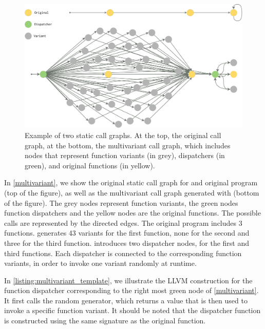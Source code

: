 \begin{figure}
    \centering
  \includegraphics[width=.9\linewidth]{diagrams/CFG.pdf}
  \caption{Example of two static call graphs. At the top, the original call graph, at the bottom, the multivariant call graph, which includes nodes that represent function variants (in grey), dispatchers (in green), and original functions  (in yellow).
}
  \label{multivariant}
\end{figure}

In \autoref{multivariant}, we show the original static call graph for and original program (top of the figure), as well as the multivariant call graph generated with \tool (bottom of the figure).
The grey nodes represent function variants, the green nodes function dispatchers and the yellow nodes are the original functions.
The possible calls are represented by the directed edges.
The original program includes 3 functions. \tool generates 43 variants for the first function, none for the second and three for the third function. 
\tool introduces two dispatcher nodes, for the first and third functions. Each dispatcher is connected to the corresponding function variants, in order to invoke one variant randomly at runtime.


In  \autoref{listing:multivariant_template}, we illustrate the LLVM construction for the function dispatcher corresponding to the right most green node of \autoref{multivariant}.
It first calls the random generator, which returns a value that is then used to invoke a specific function variant. It should be noted that the dispatcher function is constructed using the same signature as the original function. 


\lstset{
    language=llvm,
    basicstyle=\footnotesize\ttfamily,
    columns=fullflexible,
    breaklines=true,
    numbers=none,
    stepnumber=1,
    float
}

